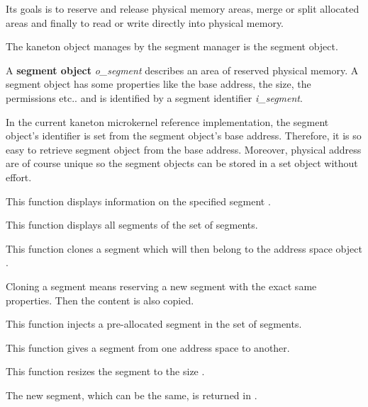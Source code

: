 Its goals is to reserve and release physical memory areas, merge or split
allocated areas and finally to read or write directly into physical memory.

The kaneton object manages by the segment manager is the segment object.

A \textbf{segment object} \textit{o\_segment} describes an area of reserved
physical memory. A segment object has some properties like the base
address, the size, the permissions etc.. and is identified by a
segment identifier \textit{i\_segment}.

In the current kaneton microkernel reference implementation, the
segment object's identifier is set from the segment object's base
address. Therefore, it is so easy to retrieve segment object from
the base address. Moreover, physical address are of course unique
so the segment objects can be stored in a set object without effort.

	 {
	   This function displays information on the specified segment
	   .
	 }

	 {
	   This function displays all segments of the set of segments.
	 }

	 {
	   This function clones a segment which will then belong to
	   the address space object .

	   Cloning a segment means reserving a new segment with the
	   exact same properties. Then the content is also copied.
	 }

	 {
	   This function injects a pre-allocated segment in the set of
	   segments.
	 }

	 {
	   This function gives a segment from one address space to another.
	 }

	 {
	   This function resizes the segment  to the
	   size .

	   The new segment, which can be the same, is returned in
	   .
	 }

